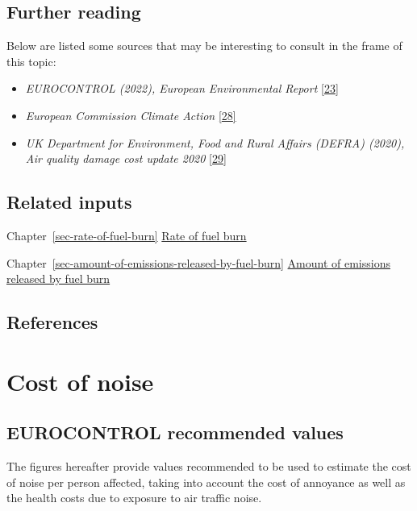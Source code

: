 \documentclass[
  11pt,
  a4paper,
]{book}
\begin{document}
\hypertarget{further-reading}{%
\section{Further reading}\label{further-reading}}

Below are listed some sources that may be interesting to consult in the
frame of this topic:

\begin{itemize}
\item
  \emph{EUROCONTROL (2022), European Environmental Report}
  \protect\hyperlink{ref-eaer2022}{{[}23{]}}
\item
  \emph{European Commission Climate Action}
  \protect\hyperlink{ref-ecc:limateaction}{{[}28{]}}
\item
  \emph{UK Department for Environment, Food and Rural Affairs (DEFRA)
  (2020), Air quality damage cost update 2020}
  \protect\hyperlink{ref-defra:2020}{{[}29{]}}
\end{itemize}

\hypertarget{related-inputs-7}{%
\section{Related inputs}\label{related-inputs-7}}

Chapter~\ref{sec-rate-of-fuel-burn}
\protect\hyperlink{ec-rate-of-fuel-burn}{Rate of fuel burn}

Chapter~\ref{sec-amount-of-emissions-released-by-fuel-burn}
\protect\hyperlink{sec-amount-of-emissions-released-by-fuel-burn}{Amount
of emissions released by fuel burn}

\hypertarget{references-8}{%
\section{References}\label{references-8}}

\hypertarget{sec-cost-of-noise}{%
\chapter{Cost of noise}\label{sec-cost-of-noise}}

\hypertarget{eurocontrol-recommended-values-6}{%
\section{EUROCONTROL recommended
values}\label{eurocontrol-recommended-values-6}}

The figures hereafter provide values recommended to be used to estimate
the cost of noise per person affected, taking into account the cost of
annoyance as well as the health costs due to exposure to air traffic
noise.
\end{document}
